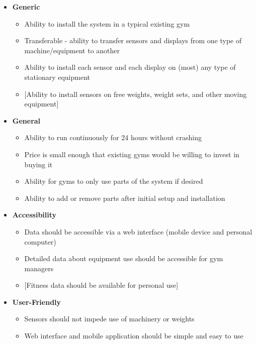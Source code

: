 \documentclass[letterpaper,11pt]{./templates/texMemo} %
\begin{document}
    \begin{itemize}
    \item{\textbf{Generic}}
    \begin{itemize}
        \item{Ability to install the system in a typical existing gym}
        \item{Transferable - ability to transfer sensors and displays from one type of machine/equipment to another}
        \item{Ability to install each sensor and each display on (most) any type of stationary equipment}
        \item{[Ability to install sensors on free weights, weight sets, and other moving equipment]}
    \end{itemize}

    \item{\textbf{General}}
    \begin{itemize}
        \item{Ability to run continuously for 24 hours without crashing}
        \item{Price is small enough that existing gyms would be willing to invest in buying it}
        \item{Ability for gyms to only use parts of the system if desired}
        \item{Ability to add or remove parts after initial setup and installation}
    \end{itemize}

    \item{\textbf{Accessibility}}
    \begin{itemize}
        \item{Data should be accessible via a web interface (mobile device and personal computer)}
        \item{Detailed data about equipment use should be accessible for gym managers}
        \item{[Fitness data should be available for personal use]}
    \end{itemize}

    \item{\textbf{User-Friendly}}
    \begin{itemize}
        \item{Sensors should not impede use of machinery or weights}
        \item{Web interface and mobile application should be simple and easy to use}
    \end{itemize}


\end{itemize}
\end{document}
